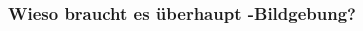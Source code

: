 \begin{frame}
	\frametitle{\uct}%
	\begin{columns}%
		\begin{column}{0.49\linewidth}%
			\centering%
		\end{column}%
		\begin{column}{0.49\linewidth}%
			\centering%
			\only<1>{}%
			\only<2|handout:0>{}%
			\only<3|handout:0>{}%
		\end{column}%
	\end{columns}%
\end{frame}

\begin{frame}
	\frametitle{Wieso braucht es überhaupt \uct-Bildgebung?}%
	\begin{columns}%
		\begin{column}{0.49\linewidth}%
\end{column}
\end{columns}
\end{frame}
